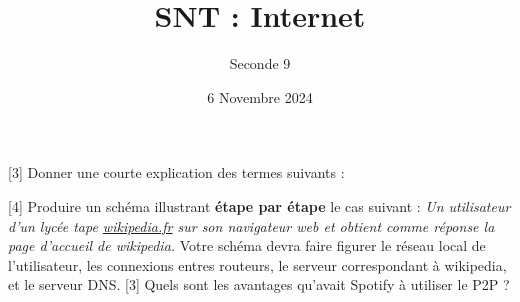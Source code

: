 \documentclass{exam}
\title{SNT : Internet}
\date{6 Novembre 2024}
\author{Seconde 9}
\begin{document}
\maketitle

\begin{questions}
[3]
Donner une courte explication des termes suivants :
[4]
Produire un schéma illustrant \textbf{étape par étape} le cas suivant : \emph{Un utilisateur d'un lycée tape \url{wikipedia.fr} sur son navigateur web et obtient comme réponse la page d'accueil de wikipedia.} Votre schéma devra faire figurer le réseau local de l'utilisateur, les connexions entres routeurs, le serveur correspondant à wikipedia, et le serveur DNS.
[3]
Quels sont les avantages qu'avait Spotify à utiliser le P2P ?
\end{questions}
\end{document}
